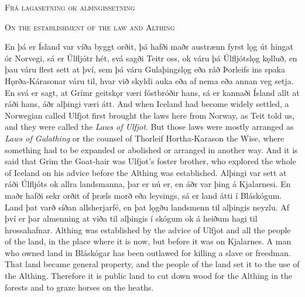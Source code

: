 \begin{paracol}{2}
    \begin{center}
        \textsc{Frá lagasetning ok alþingissetning\footnotemark}
    \end{center}
    \switchcolumn
    \begin{center}
        \textsc{On the establishment of the law and Althing}
    \end{center}
    En þá er Ísland var víða byggt orðit, þá hafði maðr austrænn fyrst lǫg út hingat ór Norvegi, sá er Úlfljótr hét, svá sagði Teitr oss, ok váru þá Úlfljótslǫg kǫlluð, en þau váru flest sett at því, sem þá váru Gulaþingslǫg eða ráð Þorleifs ins spaka Hǫrða-Kárasonar váru til, hvar við skyldi auka eða af nema eða annan veg setja. En svá er sagt, at Grímr geitskǫr væri fóstbróðir hans, sá er kannaði Ísland allt at ráði hans, áðr alþingi væri átt.
    \switchcolumn
    And when Iceland had become widely settled, a Norwegian called Ulfjot first brought the laws here from Norway, as Teit told us, and they were called the \textit{Laws of Ulfjot}. But those laws were mostly arranged as \textit{Laws of Gulathing} or the counsel of Thorleif Hortha-Karason the Wise, where something had to be expanded or abolished or arranged in another way. And it is said that Grim the Goat-hair was Ulfjot's foster brother, who explored the whole of Iceland on his advice before the Althing was established.
    \switchcolumn*
    Alþingi var sett at ráði Úlfljóts ok allra landsmanna, þar er nú er, en áðr var þing á Kjalarnesi. En maðr hafði sekr orðit of þræls morð eða leysings, sá er land átti í Bláskógum. Land þat varð síðan allsherjarfé, en þat lǫgðu landsmenn til alþingis neyzlu. Af því er þar almenning at viða til alþingis í skógum ok á heiðum hagi til hrossahafnar.
    \switchcolumn
    Althing was established by the advice of Ulfjot and all the people of the land, in the place where it is now, but before it was on Kjalarnes. A man who owned land in Bláskógar has been outlawed for killing a slave or freedman. That land became general property, and the people of the land set it to the use of the Althing. Therefore it is public land to cut down wood for the Althing in the forests and to graze horses on the heaths.
\end{paracol}

